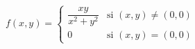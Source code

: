 \item $f(x,y) = \begin{cases} \dfrac{xy}{x^2+y^2} & \text{si } (x,y) \neq (0,0) \\ 0 & \text{si } (x,y) = (0,0) \end{cases}$
